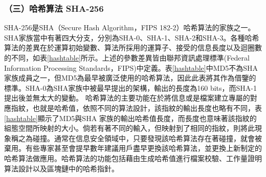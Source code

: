 				\subsubsection{（三）哈希算法 SHA-256}
				SHA-256是SHA（Secure Hash Algorithm，FIPS 182-2）\supercite{DBLP:conf/fse/KhovratovichRS12}哈希算法的家族之一。SHA家族當中有著四大分支，分別為SHA-0、SHA-1、SHA-2和SHA-3。各種哈希算法的差異在於運算初始變數、算法所採用的運算子、接受的信息長度以及迴圈數的不同，如表\ref{hashtable}所示。上述的參數差異皆由聯邦資訊處理標準(Federal Information Processing Standards，FIPS)中定義。表\ref{hashtable}中MD5不為SHA家族成員之一，但MD5為最早被廣泛使用的哈希算法，因此此表將其作為借鑒的標準。SHA-0為SHA家族中被最早提出的架構，輸出的長度為160 bits，而SHA-1提出後並無太大的變動。
				哈希算法的主要功能在於將信息或是檔案建⽴專屬的對應指紋，也就是哈希值，依照不同的算法設計，該指紋的輸出⾧度也略有不同，表\ref{hashtable}顯示了MD5與SHA 家族的輸出哈希值⾧度，而長度也意味著該指紋的組態空間所映射的大小。倘若有著不同的輸入，但映射到了相同的指紋，則將此現象稱之為碰撞。通常在信息安全領域中，只要發現該哈希算法存在著碰撞，就會被棄用。有些專家甚⾄會提早數年建議用戶盡早更換該哈希算法，並更換上新制定的哈希算法做應⽤。哈希算法的功能包括藉由生成哈希值進行檔案校驗、工作量證明算法設計以及區塊鏈中的哈希指針\supercite{Double-spendAttackModelswithTimeAdvantangeforBitcoin}。

